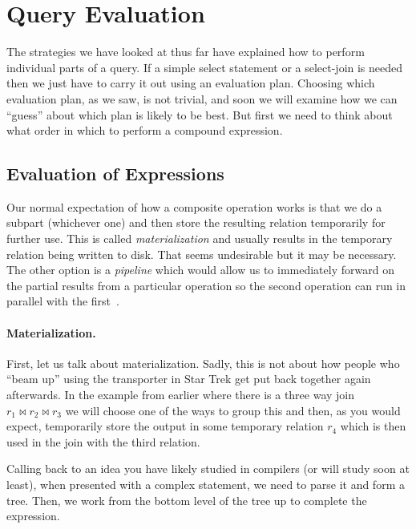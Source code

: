 




\section*{Query Evaluation}

The strategies we have looked at thus far have explained how to perform individual parts of a query. If a simple select statement or a select-join is needed then we just have to carry it out using an evaluation plan. Choosing which evaluation plan, as we saw, is not trivial, and soon we will examine how we can ``guess'' about which plan is likely to be best. But first we need to think about what order in which to perform a compound expression.

\subsection*{Evaluation of Expressions}

Our normal expectation of how a composite operation works is that we do a subpart (whichever one) and then store the resulting relation temporarily for further use. This is called \textit{materialization} and usually results in the temporary relation being written to disk. That seems undesirable but it may be necessary. The other option is a \textit{pipeline} which would allow us to immediately forward on the partial results from a particular operation so the second operation can run in parallel with the first~\cite{dsc}.

\paragraph{Materialization.} First, let us talk about materialization. Sadly, this is not about how people who ``beam up'' using the transporter in Star Trek get put back together again afterwards. In the example from earlier where there is a three way join $r_{1} \bowtie r_{2} \bowtie r_{3}$ we will choose one of the ways to group this and then, as you would expect, temporarily store the output in some temporary relation $r_{4}$ which is then used in the join with the third relation. 

Calling back to an idea you have likely studied in compilers (or will study soon at least), when presented with a complex statement, we need to parse it and form a tree. Then, we work from the bottom level of the tree up to complete the expression. 

